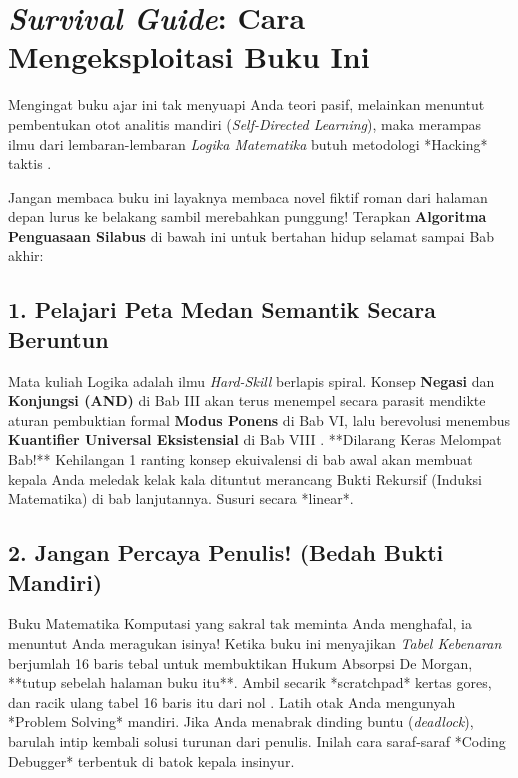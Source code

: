 \section{\textit{Survival Guide}: Cara Mengeksploitasi Buku Ini}

Mengingat buku ajar ini tak menyuapi Anda teori pasif, melainkan menuntut pembentukan otot analitis mandiri (\textit{Self-Directed Learning}), maka merampas ilmu dari lembaran-lembaran \textit{Logika Matematika} butuh metodologi *Hacking* taktis \cite{levin_discrete}. 

Jangan membaca buku ini layaknya membaca novel fiktif roman dari halaman depan lurus ke belakang sambil merebahkan punggung! Terapkan \textbf{Algoritma Penguasaan Silabus} di bawah ini untuk bertahan hidup selamat sampai Bab akhir:

\subsection{1. Pelajari Peta Medan Semantik Secara Beruntun}

Mata kuliah Logika adalah ilmu \textit{Hard-Skill} berlapis spiral. Konsep \textbf{Negasi} dan \textbf{Konjungsi (AND)} di Bab III akan terus menempel secara parasit mendikte aturan pembuktian formal \textbf{Modus Ponens} di Bab VI, lalu berevolusi menembus \textbf{Kuantifier Universal Eksistensial} di Bab VIII \cite{rosen2019,forallx}. 
**Dilarang Keras Melompat Bab!** Kehilangan 1 ranting konsep ekuivalensi di bab awal akan membuat kepala Anda meledak kelak kala dituntut merancang Bukti Rekursif (Induksi Matematika) di bab lanjutannya. Susuri secara *linear*.

\subsection{2. Jangan Percaya Penulis! (Bedah Bukti Mandiri)}

Buku Matematika Komputasi yang sakral tak meminta Anda menghafal, ia menuntut Anda meragukan isinya! Ketika buku ini menyajikan \textit{Tabel Kebenaran} berjumlah 16 baris tebal untuk membuktikan Hukum Absorpsi De Morgan, **tutup sebelah halaman buku itu**. Ambil secarik *scratchpad* kertas gores, dan racik ulang tabel 16 baris itu dari nol \cite{proofs_checker,carnap}.
Latih otak Anda mengunyah *Problem Solving* mandiri. Jika Anda menabrak dinding buntu (\textit{deadlock}), barulah intip kembali solusi turunan dari penulis. Inilah cara saraf-saraf *Coding Debugger* terbentuk di batok kepala insinyur.

